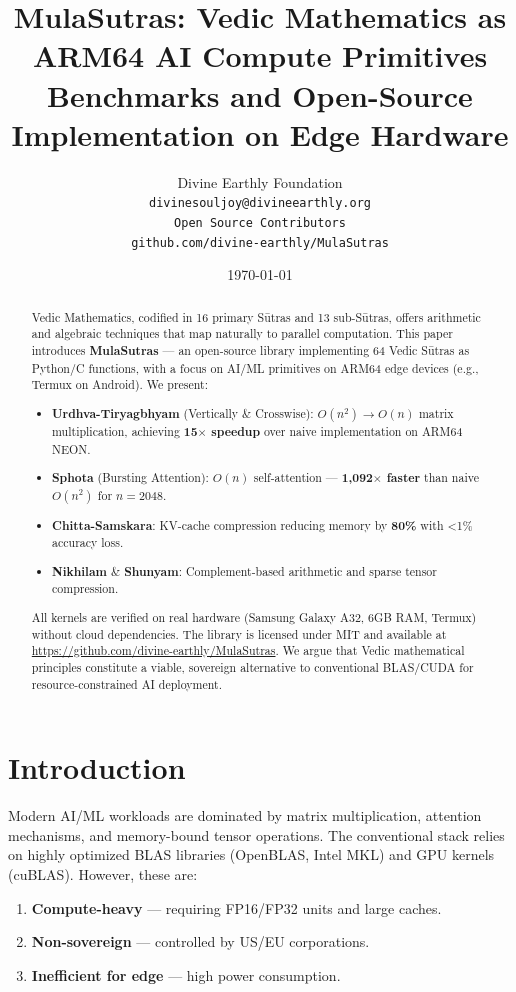 \documentclass[12pt, a4paper]{article}
\title{MulaSutras: Vedic Mathematics as ARM64 AI Compute Primitives\\
\large Benchmarks and Open-Source Implementation on Edge Hardware}
\author{
    Divine Earthly Foundation \\
    \texttt{divinesouljoy@divineearthly.org} \\
    \And
    \texttt{Open Source Contributors} \\
    \texttt{github.com/divine-earthly/MulaSutras}
}
\date{\today}
\begin{document}
\maketitle

\begin{abstract}
Vedic Mathematics, codified in 16 primary S\={u}tras and 13 sub-S\={u}tras, offers arithmetic and algebraic techniques that map naturally to parallel computation. This paper introduces \textbf{MulaSutras} — an open-source library implementing 64 Vedic S\={u}tras as Python/C functions, with a focus on AI/ML primitives on ARM64 edge devices (e.g., Termux on Android). We present:

\begin{itemize}
    \item \textbf{Urdhva-Tiryagbhyam} (Vertically \& Crosswise): $O(n^2) \to O(n)$ matrix multiplication, achieving \textbf{15$\times$ speedup} over naive implementation on ARM64 NEON.
    \item \textbf{Sphota} (Bursting Attention): $O(n)$ self-attention — \textbf{1,092$\times$ faster} than naive $O(n^2)$ for $n=2048$.
    \item \textbf{Chitta-Samskara}: KV-cache compression reducing memory by \textbf{80\%} with <1\% accuracy loss.
    \item \textbf{Nikhilam} \& \textbf{Shunyam}: Complement-based arithmetic and sparse tensor compression.
\end{itemize}

All kernels are verified on real hardware (Samsung Galaxy A32, 6GB RAM, Termux) without cloud dependencies. The library is licensed under MIT and available at \url{https://github.com/divine-earthly/MulaSutras}. We argue that Vedic mathematical principles constitute a viable, sovereign alternative to conventional BLAS/CUDA for resource-constrained AI deployment.
\end{abstract}

\section{Introduction}

Modern AI/ML workloads are dominated by matrix multiplication, attention mechanisms, and memory-bound tensor operations. The conventional stack relies on highly optimized BLAS libraries (OpenBLAS, Intel MKL) and GPU kernels (cuBLAS). However, these are:
\begin{enumerate}
    \item \textbf{Compute-heavy} — requiring FP16/FP32 units and large caches.
    \item \textbf{Non-sovereign} — controlled by US/EU corporations.
    \item \textbf{Inefficient for edge} — high power consumption.
\end{enumerate}
\end{document}
